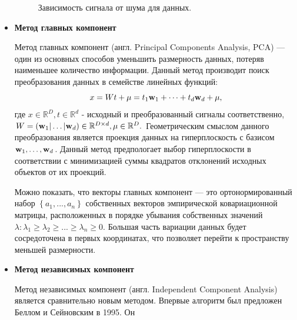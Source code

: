 \documentclass[12pt,fleqn]{article}
\begin{document}
\begin{itemize}
\begin{figure}[H]
\begin{minipage}[H]{1.0\linewidth}
\end{minipage}
\begin{minipage}[H]{1.0\linewidth}
\end{minipage}
\caption{Зависимость сигнала от шума для данных.}
\label{wavelet_scheme}
\end{figure}
	\item
	{\bf Метод главных компонент}
	\par Метод главных компонент (англ. Principal Components Analysis, PCA) — один из основных способов уменьшить размерность данных, потеряв наименьшее количество информации. Данный метод производит поиск преобразования данных в семействе линейных функций:
$$x = Wt + \mu = t_1 {\textbf w_1} + \dots + t_d {\textbf w_d} + \mu,$$
где $x \in \mathbb{R}^D, t \in \mathbb{R}^d$ - исходный и преобразованный сигналы соответственно, $W = ( {\textbf w_1}| \dots | { \textbf w_d}) \in \mathbb{R}^{D \times d}, \mu \in \mathbb{R}^D.$ Геометрическим смыслом данного преобразования является проекция данных на гиперплоскость с базисом ${\textbf w_1}, \dots, {\textbf w_d}$. Данный метод предпологает выбор гиперплоскости в соответствии с минимизацией суммы квадратов отклонений исходных объектов от их проекций.
	\par Можно показать, что векторы главных компонент — это ортонормированный набор  $\left\{a_1,..., a_n \right\}$ собственных векторов эмпирической ковариационной матрицы, расположенных в порядке убывания собственных значений $\lambda: \lambda_1 \ge \lambda_2 \ge ... \ge \lambda_n \ge 0$. Большая часть вариации данных будет сосредоточена в первых координатах, что позволяет перейти к пространству меньшей размерности.
	\item
	{\bf Метод независимых компонент}
	\par Метод независимых компонент (англ. Independent Component Analysis) является сравнительно новым методом. Впервые алгоритм был предложен Беллом и Сейновским в 1995. Он 

\end{itemize}
\end{document}
